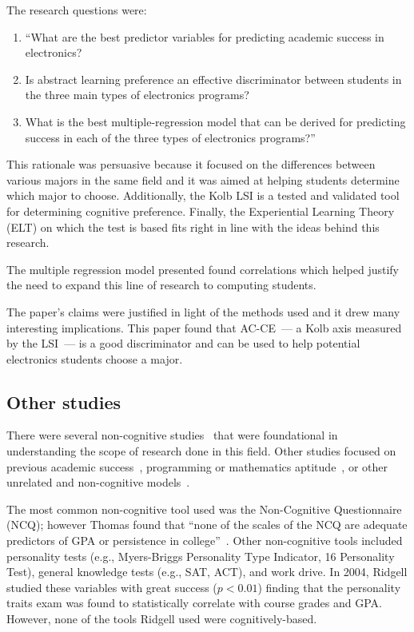 The research questions were:
\begin{enumerate}
  \item ``What are the best predictor variables for predicting academic success in electronics?
  \item Is abstract learning preference an effective discriminator between students in the three main types of electronics programs?
  \item What is the best multiple-regression model that can be derived for predicting success in each of the three types of electronics programs?''~\citep{lunt1996}
\end{enumerate}

This rationale was persuasive because it focused on the differences between various majors in the same field and it was aimed at helping students determine which major to choose. Additionally, the Kolb LSI is a tested and validated tool for determining cognitive preference. Finally, the Experiential Learning Theory (ELT) on which the test is based fits right in line with the ideas behind this research.

The multiple regression model presented found correlations which helped justify the need to expand this line of research to computing students.

The paper's claims were justified in light of the methods used and it drew many interesting implications. This paper found that AC-CE~--- a Kolb axis measured by the LSI~--- is a good discriminator and can be used to help potential electronics students choose a major.

\subsection{Other studies}
There were several non-cognitive studies~\citep{thomas2007, elnagar2013, ridgell2004, ting2001} that were foundational in understanding the scope of research done in this field. Other studies focused on previous academic success~\citep{barlow2011, golding2005, ting2001, campbell1984}, programming or mathematics aptitude~\citep{nowaczyk1984, evans1989}, or other unrelated and non-cognitive models~\citep{barlow2011, elnagar2013}.

The most common non-cognitive tool used was the Non-Cognitive Questionnaire (NCQ); however Thomas found that ``none of the scales of the NCQ are adequate predictors of GPA or persistence in college''~\citep{thomas2007}. Other non-cognitive tools included personality tests (e.g., Myers-Briggs Personality Type Indicator, 16 Personality Test), general knowledge tests (e.g., SAT, ACT), and work drive. In 2004, Ridgell studied these variables with great success ($p<0.01$) finding that the personality traits exam was found to statistically correlate with course grades and GPA. However, none of the tools Ridgell used were cognitively-based.

